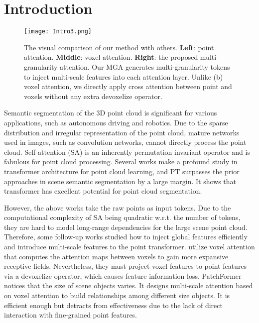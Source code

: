 \documentclass[10pt,twocolumn,letterpaper]{article}
\begin{document}
\section{Introduction}
\begin{figure}
\centering
\texttt{[image: Intro3.png]}
\caption{The visual comparison of our method with others. \textbf{Left}: point attention. \textbf{Middle}: voxel attention. \textbf{Right}: the proposed multi-granularity attention. Our MGA generates multi-granularity tokens to inject multi-scale features into each attention layer. Unlike (b) voxel attention, we directly apply cross attention between point and voxels without any extra devoxelize operator.}

\label{fig_comparison}
\end{figure}


Semantic segmentation of the 3D point cloud is significant for various applications, such as autonomous driving and robotics. Due to the sparse distribution and irregular representation of the point cloud, mature networks used in images, such as convolution networks, cannot directly process the point cloud. 
Self-attention (SA) is an inherently permutation invariant operator and is fabulous for point cloud processing. Several works \cite{pt2021,pct2021,dtnet2021,strTransformer} make a profound study in transformer architecture\cite{transformer2017} for point cloud learning, and PT\cite{pt2021} surpasses the prior approaches\cite{pointnet, pointnet2, pccn, pointconv, kpconv, randlanet} in scene semantic segmentation by a large margin. It shows that transformer has excellent potential for point cloud segmentation. 

However, the above works\cite{pt2021,pct2021,dtnet2021,strTransformer} take the raw points as input tokens. Due to the computational complexity of SA being quadratic w.r.t. the number of tokens, they are hard to model long-range dependencies for the large scene point cloud. 
Therefore, some follow-up works studied how to inject global features efficiently and introduce multi-scale features to the point transformer.
\cite{pvt2021,crossscaletrans2022} utilize voxel attention that computes the attention maps between voxels to gain more expansive receptive fields. Nevertheless, they must project voxel features to point features via a devoxelize operator, which causes feature information loss. 
PatchFormer\cite{patchformer2022} notices that the size of scene objects varies. It designs multi-scale attention based on voxel attention to build relationships among different size objects. It is efficient enough but detracts from effectiveness due to the lack of direct interaction with fine-grained point features. 
\end{document}
